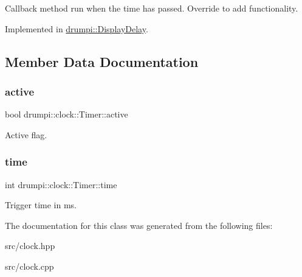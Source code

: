 Callback method run when the time has passed. Override to add functionality. 

Implemented in \hyperlink{classdrumpi_1_1DisplayDelay_a1fb66a57fea2d6700a190c961e556aa4}{drumpi\+::\+Display\+Delay}.



\subsection{Member Data Documentation}
\mbox{\label{classdrumpi_1_1clock_1_1Timer_a6a750b89a375a5f73f2d28ac951c0d24}} 
\subsubsection{\texorpdfstring{active}{active}}
{\footnotesize\ttfamily bool drumpi\+::clock\+::\+Timer\+::active\hspace{0.3cm}{\ttfamily [private]}}

Active flag. \mbox{\label{classdrumpi_1_1clock_1_1Timer_a34ceb43c3f8fa2fd42f73aefb133497b}} 
\subsubsection{\texorpdfstring{time}{time}}
{\footnotesize\ttfamily int drumpi\+::clock\+::\+Timer\+::time\hspace{0.3cm}{\ttfamily [private]}}

Trigger time in ms. 

The documentation for this class was generated from the following files\+:\begin{DoxyCompactItemize}
\item 
src/clock.\+hpp\item 
src/clock.\+cpp\end{DoxyCompactItemize}
